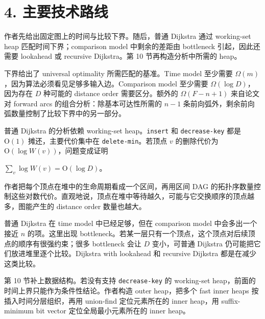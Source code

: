 \section*{4. 主要技术路线}
作者先给出固定图上的时间与比较下界。随后，普通 Dijkstra 通过 working-set heap 匹配时间下界；comparison model 中剩余的差距由 bottleneck 引起，因此还需要 lookahead 或 recursive Dijkstra。第 10 节再构造分析中所需的 heap。

下界给出了 universal optimality 所需匹配的基准。Time model 至少需要 \(\Omega(m)\)，因为算法必须看见足够多输入边。Comparison model 至少需要 \(\Omega(\log D)\)，因为存在 \(D\) 种可能的 distance order 需要区分。额外的 \(\Omega(F-n+1)\) 来自论文对 forward arcs 的组合分析：除基本可达性所需的 \(n-1\) 条前向弧外，剩余前向弧数量控制了比较下界中的另一部分。

普通 Dijkstra 的分析依赖 working-set heap。\texttt{insert} 和 \texttt{decrease-\allowbreak{}key} 都是 \(\mathrm{O}(1)\) 摊还，主要代价集中在 \texttt{delete-\allowbreak{}min}。若顶点 \(v\) 的删除代价为 \(\mathrm{O}(\log W(v))\)，问题变成证明

\(\sum_v \log W(v)=\mathrm{O}(\log D)\)。

作者把每个顶点在堆中的生命周期看成一个区间，再用区间 DAG 的拓扑序数量控制这些对数代价。直观地说，顶点在堆中等待越久，可能与它交换顺序的顶点越多，图能产生的 distance order 数量也越大。

普通 Dijkstra 在 time model 中已经足够，但在 comparison model 中会多出一个接近 \(n\) 的项。这里出现 bottleneck。若某一层只有一个顶点，这个顶点对后续顶点的顺序有很强约束；很多 bottleneck 会让 \(D\) 变小，可普通 Dijkstra 仍可能把它们放进堆里逐个比较。Dijkstra with lookahead 和 recursive Dijkstra 都是在减少这类比较。

第 10 节补上数据结构。若没有支持 \texttt{decrease-\allowbreak{}key} 的 working-set heap，前面的时间上界只能作为条件性结论。作者构造 outer heap，把多个 fast inner heaps 按插入时间分层组织，再用 union-find 定位元素所在的 inner heap，用 suffix-minimum bit vector 定位全局最小元素所在的 inner heap。
